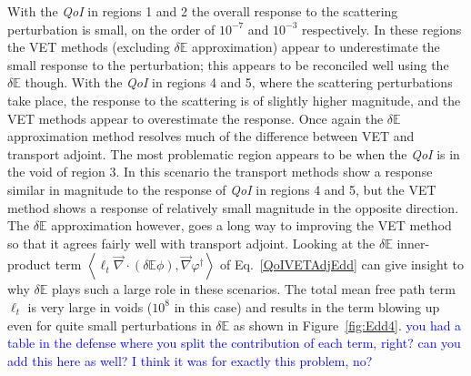 \documentclass[12pt]{report}
\newcommand{\bra}{\left\langle}
\newcommand{\ket}{\right\rangle}
\renewcommand{\div}{\vec{\nabla} \cdot}
\newcommand{\grad}{\vec{\nabla}}
\newcommand{\vefadj}{\varphi^\dag}
\newcommand{\Edd}{\mathbb{E}}
\newcommand{\isigt}{\ell_t}
\newcommand{\qoi}{{\it QoI}\xspace}
\newcommand{\comment}[2]{\marginpar{\textcolor{#2}{$\star$}}\textcolor{#2}{#1}\newline}
\newcommand{\jcr}[1]{\comment{#1}{blue}}
\newcommand{\jcr}[1]{\phantom{a}}
\begin{document}
With the \qoi in regions 1 and 2 the overall response to the scattering perturbation is small, on the order of $10^{-7}$ and $10^{-3}$ respectively. In these regions the VET methods (excluding $\delta \Edd$ approximation) appear to underestimate the small response to the perturbation; this appears to be reconciled well using the $\delta \Edd$ though. With the \qoi in regions 4 and 5, where the scattering perturbations take place, the response to the scattering is of slightly higher magnitude, and the VET methods appear to overestimate the response. Once again the $\delta \Edd$ approximation method resolves much of the difference between VET and transport adjoint. The most problematic region appears to be when the \qoi is in the void of region 3. In this scenario the transport methods show a response similar in magnitude to the response of \qoi in regions 4 and 5, but the VET method shows a response of relatively small magnitude in the opposite direction. The $\delta \Edd$ approximation however, goes a long way to improving the VET method so that it agrees fairly well with transport adjoint. Looking at the $\delta \Edd$ inner-product term $ \bra  \isigt \div \left( \delta \Edd \phi \right), \grad \vefadj \ket$ of Eq.~\eqref{QoIVETAdjEdd} can give insight to why $\delta \Edd$ plays such a large role in these scenarios. The total mean free path term $\isigt$ is very large in voids ($10^8$ in this case) and results in the term blowing up even for quite small perturbations in $\delta \Edd$ as shown in Figure~\ref{fig:Edd4}.
\jcr{you had a table in the defense where you split the contribution of each term, right? can you add this here as well? I think it was for exactly this problem, no?}
\end{document}
